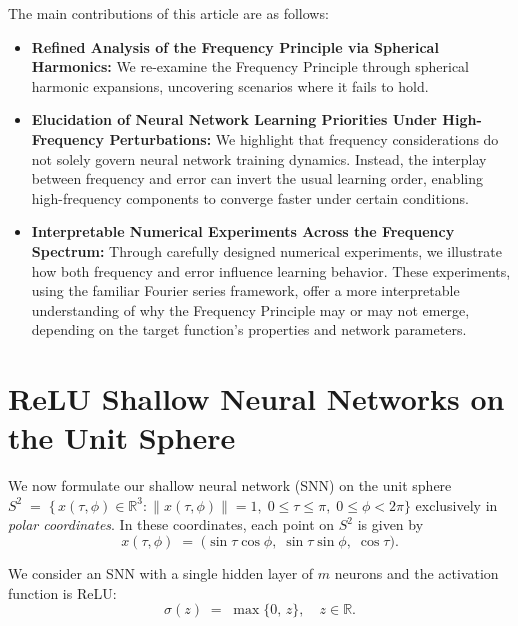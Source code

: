 \documentclass[review,onefignum,onetabnum,onealgnum]{siamart250106}
\numberwithin{theorem}{section}
\begin{document}
The main contributions of this article are as follows:
\begin{itemize}
\item \textbf{Refined Analysis of the Frequency Principle via Spherical Harmonics:} We re-examine the Frequency Principle through spherical harmonic expansions, uncovering scenarios where it fails to hold.
\item \textbf{Elucidation of Neural Network Learning Priorities Under High-Frequency Perturbations:} We highlight that frequency considerations do not solely govern neural network training dynamics. Instead, the interplay between frequency and error can invert the usual learning order, enabling high-frequency components to converge faster under certain conditions.
\item \textbf{Interpretable Numerical Experiments Across the Frequency Spectrum:} Through carefully designed numerical experiments, we illustrate how both frequency and error influence learning behavior. These experiments, using the familiar Fourier series framework, offer a more interpretable understanding of why the Frequency Principle may or may not emerge, depending on the target function’s properties and network parameters.
\end{itemize}

\section{ReLU Shallow Neural Networks on the Unit Sphere}
\label{Sec:Preliminaries}

We now formulate our shallow neural network (SNN) on the unit sphere 
\(S^2 \;=\;\bigl\{\,x(\tau,\phi)\in\mathbb{R}^3 :\|x(\tau,\phi)\|=1,\;0\le\tau\le\pi,\;0\le\phi<2\pi\bigr\}\) exclusively in \emph{polar coordinates}.  In these coordinates, each point on \(S^2\) is given by
\begin{equation}\label{spherecordinate}
    x(\tau,\phi) 
\;=\; 
\bigl(\sin\tau\cos\phi,\;\sin\tau\sin\phi,\;\cos\tau\bigr).
\end{equation}


We consider an SNN with a single hidden layer of \(m\) neurons and the activation function is ReLU:
\begin{equation}\label{Relu}
    \sigma(z) \;=\;\max\{0,\,z\}, 
\quad z\in\mathbb{R}.
\end{equation}
\end{document}
